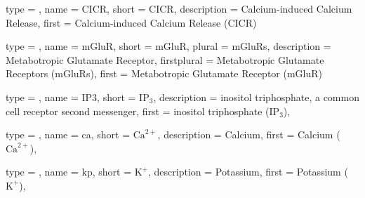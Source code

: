 {
	type        = \acronymtype,
	name        = {CICR},
	short       = {CICR},
	description = {Calcium-induced Calcium Release},
	first       = {Calcium-induced Calcium Release (CICR)}
}

{
	type        = \acronymtype,
	name        = {mGluR},
	short       = {mGluR},
    plural      = {mGluRs},
	description = {Metabotropic Glutamate Receptor},
	firstplural = {Metabotropic Glutamate Receptors (mGluRs)},
	first       = {Metabotropic Glutamate Receptor (mGluR)}
}

{
	type        = \acronymtype,
	name        = {IP3},
	short       = {$\textrm{IP}_3$},
	description = {inositol triphosphate, a common cell receptor second messenger},
	first = {inositol triphosphate ($\textrm{IP}_3$)},
}

{
	type        = \acronymtype,
	name        = {ca},
	short       = {$\textrm{Ca}^{2+}$},
	description = {Calcium},
	first = {Calcium ($\textrm{Ca}^{2+}$)},
}

{
	type        = \acronymtype,
	name        = {kp},
	short       = {$\textrm{K}^{+}$},
	description = {Potassium},
	first = {Potassium ($\textrm{K}^{+}$)},
}


